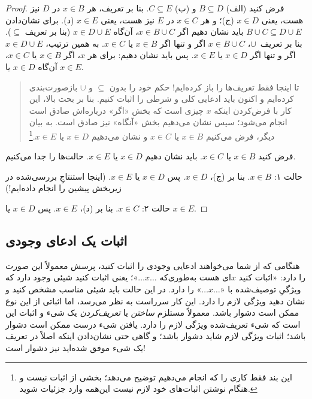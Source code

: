 \documentclass[../../../include/open-logic-section]{subfiles}
\begin{document}
\begin{proof}
  فرض کنید (الف) $B \subseteq D$ و (ب) $C \subseteq E$. بنا بر
  تعریف، هر $x \in B$ در $D$ نیز هست، یعنی $x \in D$ (ج)؛ و هر
  $x \in C$ در $E$ نیز هست، یعنی $x \in E$ (د). برای نشان‌دادن
  $B \cup C \subseteq D \cup E$ باید نشان دهیم اگر
  $x \in B \cup C$، آن‌گاه $x \in D \cup E$ (بنا بر تعریف
  $\subseteq$). بنا بر تعریف~$\cup$،
  $x \in B \cup C$ اگر و تنها اگر $x \in B$ یا $x \in C$. به همین
  ترتیب، $x \in D \cup E$ اگر و تنها اگر $x \in D$ یا $x \in E$.
  پس باید نشان دهیم: برای هر $x$، اگر $x \in B$ یا $x \in C$،
  آن‌گاه $x \in D$ یا $x \in E$.

  \begin{quote}
  تا اینجا فقط تعریف‌ها را باز کرده‌ایم!{} حکم خود را بدون
  $\subseteq$ و $\cup$ بازصورت‌بندی کرده‌ایم و اکنون باید ادعایی
  کلی و شرطی را اثبات کنیم. بنا بر بحث بالا، این کار با فرض‌کردن
  اینکه $x$ چیزی است که بخش «اگر» درباره‌اش صادق است انجام می‌شود؛
  سپس نشان می‌دهیم بخش «آنگاه» نیز صادق است. به بیان دیگر، فرض
  می‌کنیم $x \in B$ یا $x \in C$ و نشان می‌دهیم
  $x \in D$ یا $x \in E$.\footnote{این بند فقط کاری را که انجام
  می‌دهیم توضیح می‌دهد؛ بخشی از اثبات نیست و هنگام نوشتن اثبات‌های
  خود لازم نیست این‌همه وارد جزئیات شوید.}
  \end{quote}

  فرض کنید $x \in B$ یا $x \in C$. باید نشان دهیم $x \in D$ یا
  $x \in E$. حالت‌ها را جدا می‌کنیم.

  حالت ۱: $x \in B$. بنا بر (ج)، $x \in D$. پس $x \in D$ یا
  $x \in E$. (اینجا استنتاجِ بررسی‌شده در زیربخش پیشین را انجام
  داده‌ایم!)

  حالت ۲: $x \in C$. بنا بر (د)، $x \in E$. پس $x \in D$ یا
  $x \in E$.
 \end{proof}


\subsection{اثبات یک ادعای وجودی}

هنگامی که از شما می‌خواهند ادعایی وجودی را اثبات کنید، پرسش معمولاً
این صورت را دارد: «اثبات کنید $x$ای هست به‌طوری‌که
$\dots x \dots$»؛ یعنی اثبات کنید شیئی وجود دارد که ویژگیِ توصیف‌شده
با «$\dots x \dots$» را دارد. در این حالت باید شیئی مناسب مشخص کنید
و نشان دهید ویژگی لازم را دارد. این کار سرراست به نظر می‌رسد، اما
اثباتی از این نوع ممکن است دشوار باشد. معمولاً مستلزم
\emph{ساختن} یا \emph{تعریف‌کردن} یک شیء و اثبات این است که شیء
تعریف‌شده ویژگی لازم را دارد. یافتن شیء درست ممکن است دشوار باشد؛
اثبات ویژگی لازم شاید دشوار باشد؛ و گاهی حتی نشان‌دادن اینکه اصلاً
در تعریف یک شیء موفق شده‌اید نیز دشوار است!{}
\end{document}
